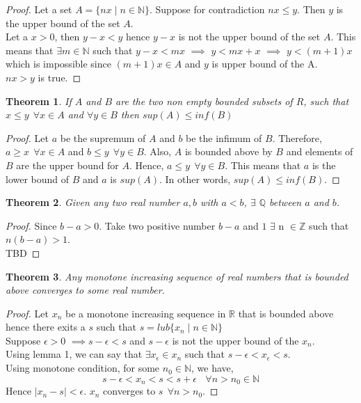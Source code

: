 \documentclass[12pt]{report}
\newtheorem{thm}{Theorem}
\theoremstyle{definition}
\begin{document}
\begin{proof}
    Let a set $A = \{nx \mid n \in \mathbb{N}\}$. Suppose for contradiction $ nx \leq y$. Then $y$ is the upper bound of the set $A$. \\
    Let a $x > 0$, then $ y - x < y$ hence $y - x$ is not the upper bound of the set $A$. This means that $\exists m \in \mathbb{N}$ such that $y - x < mx$ $\implies$ $y < mx + x$ $\implies$ $y < (m+1)x$ which is impossible since $(m+1)x \in A$ and $y$ is upper bound of the A.\\
    $ nx > y$ is true.
\end{proof}
\begin{thm}
    If $A$ and $B$ are the two non empty bounded subsets of $R$, such that $x \leq y ~~ \forall x \in A$ and $\forall y \in B$ then $sup(A) \leq inf(B)$
\end{thm}
\begin{proof}
    Let $a$ be the supremum of $A$ and $b$ be the infimum of $B$. Therefore, \linebreak $a \geq x~~\forall x \in A$ and $ b \leq y~~ \forall y \in B$. Also, $A$ is bounded above by $B$ and elements of $B$ are the upper bound for $A$. Hence, $a \leq y ~~ \forall y \in B$. This means that $a$ is the lower bound of $B$ and $a$ is $sup(A)$. In other words, $sup(A) \leq inf(B)$. 
\end{proof}
\begin{thm}
    Given any two real number $a,b$ with $a<b$, $\exists$ $\mathbb{Q}$ between $a$ and $b$.
\end{thm}
\begin{proof}
    Since $b-a > 0$. Take two positive number $b-a$ and $1$ $\exists$ n $\in \mathbb{Z}$ such that $n(b-a) > 1$.\\ TBD
\end{proof}
\begin{thm}
    Any monotone increasing sequence of real numbers that is bounded above converges to some real number.
\end{thm}
\begin{proof}
    Let $x_n$ be a monotone increasing sequence in $\mathbb{R}$ that is bounded above hence there exits a $s$ such that $s = lub\{x_n \mid n \in \mathbb{N}\}$ \\
    Suppose $\epsilon > 0$ $\implies s - \epsilon < s$ and $s - \epsilon$ is not the upper bound of the $x_n$.\\ 
    Using lemma 1, we can say that $\exists x_\epsilon \in x_n$ such that $s - \epsilon < x_\epsilon < s$.\\
    Using monotone condition, for some $n_0 \in \mathbb{N}$, we have,
    $$ s - \epsilon < x_n < s < s + \epsilon~~~~\forall n > n_0 \in \mathbb{N}$$ Hence $ |x_n - s| < \epsilon$. $x_n$ converges to $s~~\forall n > n_0.$ 
\end{proof}
\end{document}
